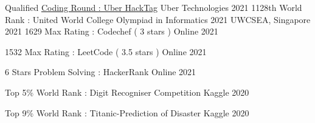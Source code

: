 



\begin{cvhonors}

  \cvhonor
    {Qualified} %
    {\href{https://nikhil-bhasin.netlify.app/data/Uber_HackTag.pdf}{Coding Round : Uber HackTag}} %
    {Uber Technologies} %
    {2021} %
  \cvhonor
    {1128th} %
    {World Rank : United World College Olympiad in Informatics 2021} %
    {UWCSEA, Singapore} %
    {2021} %
  \cvhonor
    {1629} %
    {Max Rating : Codechef ( 3 stars )} %
    {Online} %
    {2021} %

  \cvhonor
    {1532} %
    {Max Rating : LeetCode ( 3.5 stars )} %
    {Online} %
    {2021} %


  \cvhonor
    {6 Stars} %
    {Problem Solving : HackerRank} %
    {Online} %
    {2021} %

  \cvhonor
    {Top 5\%} %
    {World Rank : Digit Recogniser Competition} %
    {Kaggle} %
    {2020} %
    
\cvhonor
    {Top 9\% } %
    {World Rank : Titanic-Prediction of Disaster} %
    {Kaggle} %
    {2020} %

\end{cvhonors}




